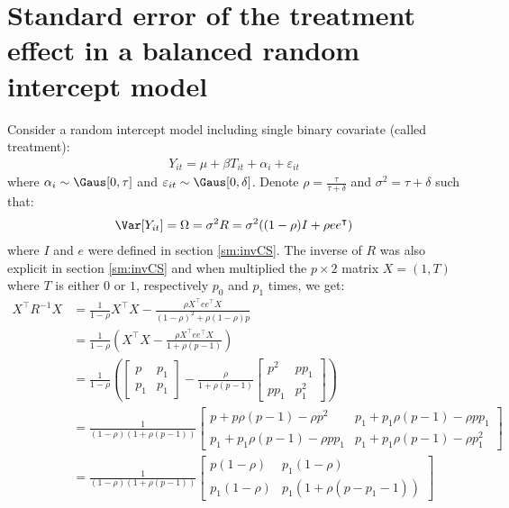 \documentclass[12pt]{article}
\newcommand\trans[1]{{#1}^\intercal}%
\begin{document}
\clearpage

\section{Standard error of the treatment effect \newline in a balanced random intercept model}
\label{sm:seRI}
Consider a random intercept model including single binary covariate
(called treatment):
\begin{align*}
Y_{it} = \mu + \beta T_{it} + \alpha_i + \varepsilon_{it}
\end{align*}
where \(\alpha_i \sim \Gaus[0,\tau]\) and \(\varepsilon_{it} \sim
\Gaus[0,\delta]\). Denote \(\rho = \frac{\tau}{\tau+\delta}\) and
\(\sigma^2=\tau+\delta\) such that:
\begin{align*}
\Var[Y_{it}] = \Omega = \sigma^2 R = \sigma^2 ((1-\rho) I + \rho e\trans{e})
\end{align*}
where \(I\) and \(e\) were defined in section \ref{sm:invCS}. The inverse
of \(R\) was also explicit in section \ref{sm:invCS} and when multiplied
the \(p \times 2\) matrix \(X=(1,T)\) where \(T\) is either \(0\) or
\(1\), respectively \(p_0\) and \(p_1\) times, we get:
\begin{align*}
\trans{X} R^{-1} X &= \frac{1}{1-\rho} \trans{X}X - \frac{\rho\trans{X} e\trans{e} X}{(1-\rho)^2+\rho(1-\rho)p}  \\
&= \frac{1}{1-\rho} \left(\trans{X}X - \frac{\rho\trans{X} e\trans{e} X}{1 + \rho (p-1)}\right)  \\
&= \frac{1}{1-\rho} \left(\begin{bmatrix} p & p_1 \\ p_1 & p_1 \end{bmatrix} - \frac{\rho}{1+\rho(p-1)}  \begin{bmatrix} p^2 & p p_1 \\ p p_1 & p^2_1 \end{bmatrix}\right) \\
&= \frac{1}{(1-\rho)(1+\rho(p-1))} \begin{bmatrix} p+p\rho(p-1) - \rho p^2
                  & p_1+p_1\rho(p-1)- \rho p p_1
                  \\ p_1+p_1\rho(p-1)- \rho p p_1
                  & p_1+p_1\rho(p-1)- \rho p_1^2
\end{bmatrix}   \\
&= \frac{1}{(1-\rho)(1+\rho(p-1))} \begin{bmatrix} p(1-\rho)
                  & p_1(1-\rho)
                  \\ p_1(1-\rho)
                  & p_1(1+\rho (p-p_1-1))
\end{bmatrix}   
\end{align*}
\end{document}
